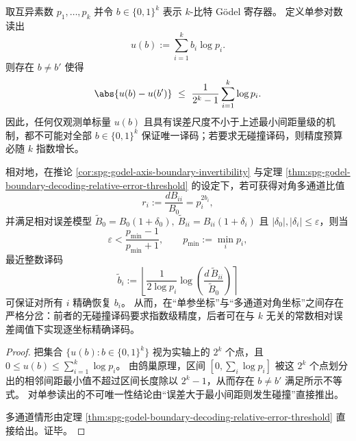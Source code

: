 \begin{theorem}\label{thm:spg-single-parameter-log-readout-vs-diagonal-multichannel-bifurcation}
取互异素数 \(p_1,\dots,p_k\) 并令 \(b\in\{0,1\}^k\) 表示 \(k\)-比特 Gödel 寄存器。
定义单参对数读出
\[
u(b):=\sum_{i=1}^k b_i\log p_i.
\]
则存在 \(b\neq b'\) 使得
\[
\abs{u(b)-u(b')}
\ \le\
\frac{1}{2^k-1}\sum_{i=1}^k \log p_i.
\]
因此，任何仅观测单标量 \(u(b)\) 且具有误差尺度不小于上述最小间距量级的机制，都不可能对全部 \(b\in\{0,1\}^k\) 保证唯一译码；若要求无碰撞译码，则精度预算必随 \(k\) 指数增长。
\par
相对地，在推论 \ref{cor:spg-godel-axis-boundary-invertibility} 与定理 \ref{thm:spg-godel-boundary-decoding-relative-error-threshold} 的设定下，若可获得对角多通道比值
\[
r_i:=\frac{dB_{ii}}{B_0}=p_i^{2b_i},
\]
并满足相对误差模型
\(
\widetilde B_0=B_0(1+\delta_0),\ 
\widetilde B_{ii}=B_{ii}(1+\delta_i)
\)
且 \(|\delta_0|,|\delta_i|\le\varepsilon\)，则当
\[
\varepsilon<\frac{p_{\min}-1}{p_{\min}+1},
\qquad
p_{\min}:=\min_i p_i,
\]
最近整数译码
\[
\widetilde b_i:=\left\lfloor \frac{1}{2\log p_i}\log\!\left(\frac{d\,\widetilde B_{ii}}{\widetilde B_0}\right)\right\rceil
\]
可保证对所有 \(i\) 精确恢复 \(b_i\)。
从而，在“单参坐标”与“多通道对角坐标”之间存在严格分岔：前者的无碰撞译码要求指数级精度，后者可在与 \(k\) 无关的常数相对误差阈值下实现逐坐标精确译码。
\end{theorem}
\begin{proof}
把集合 \(\{u(b):b\in\{0,1\}^k\}\) 视为实轴上的 \(2^k\) 个点，且
\(
0\le u(b)\le \sum_{i=1}^k\log p_i
\)。
由鸽巢原理，区间 \([0,\sum_i\log p_i]\) 被这 \(2^k\) 个点划分出的相邻间距最小值不超过区间长度除以 \(2^k-1\)，从而存在 \(b\neq b'\) 满足所示不等式。
对单参读出的不可唯一性结论由“误差大于最小间距则发生碰撞”直接推出。
\par
多通道情形由定理 \ref{thm:spg-godel-boundary-decoding-relative-error-threshold} 直接给出。证毕。
\end{proof}

\endinput

